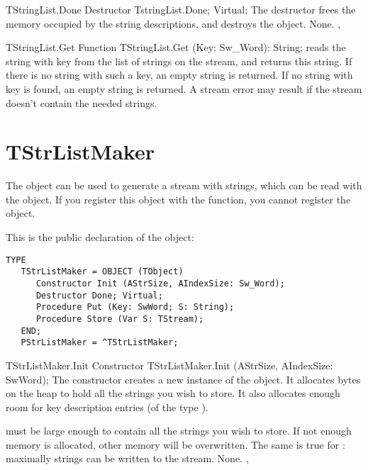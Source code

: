 \begin{procedure}{TStringList.Done}
\Declaration
Destructor TstringList.Done; Virtual;
\Description
The  destructor frees the memory occupied by the string
descriptions, and destroys the object.
\Errors
None.
\SeeAlso
{}, 
\end{procedure}

\begin{function}{TStringList.Get}
\Declaration
Function TStringList.Get (Key: Sw\_Word): String;
\Description
{} reads the string with key  from the list of strings on the
stream, and returns this string. If there is no string with such a key, an
empty string is returned.
\Errors
If no string with key  is found, an empty string is returned.
A stream error may result if the stream doesn't contain the needed strings.
\SeeAlso
{}
\end{function}
\section{TStrListMaker}
\label{se:TStrListMaker}

The  object can be used to generate a stream with
strings, which can be read with the  object.
If you register this object with the 
function, you cannot register the  object.

This is the public declaration of the  object:
\begin{verbatim}
TYPE
   TStrListMaker = OBJECT (TObject)
      Constructor Init (AStrSize, AIndexSize: Sw_Word);
      Destructor Done; Virtual;
      Procedure Put (Key: SwWord; S: String);
      Procedure Store (Var S: TStream);
   END;
   PStrListMaker = ^TStrListMaker;
\end{verbatim}

\begin{procedure}{TStrListMaker.Init}
\Declaration
Constructor TStrListMaker.Init (AStrSize, AIndexSize: SwWord);
\Description
The  constructor creates a new instance of the 
object. It allocates  bytes on the heap to hold all the
strings you wish to store. It also allocates enough room for 
 key description entries (of the type ).

 must be large enough to contain all the strings you wish to
store. If not enough memory is allocated, other memory will be overwritten.
The same is true for  : maximally  strings
can be written to the stream.
\Errors
None.
\SeeAlso
{}, 
\end{procedure}

